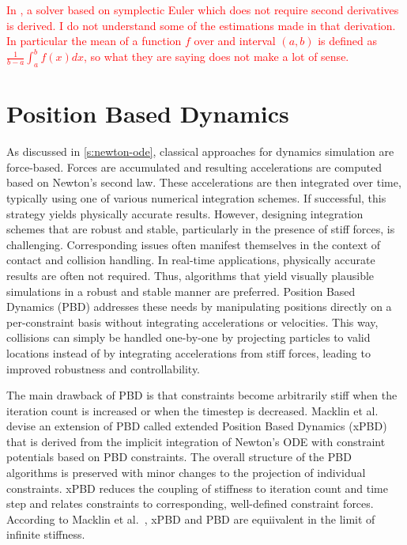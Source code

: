 \textcolor{red}{
    In \cite{servin2006}, a solver based on symplectic Euler which does not require second derivatives is derived. I do not understand some of the
    estimations made in that derivation. In particular the mean of a function $f$ over and interval $(a, b)$ is defined as $\frac{1}{b-a}
    \int_a^b f(x) dx$, so what they are saying does not make a lot of sense.}

\section{Position Based Dynamics}\label{s:pbd}
As discussed in \cref{s:newton-ode}, classical approaches for dynamics simulation are force-based. Forces are accumulated and resulting accelerations
are computed based on Newton's second law. These accelerations are then integrated over time, typically using one of various numerical integration
schemes. If successful, this strategy yields physically accurate results. However, designing integration schemes that are robust and stable,
particularly in the presence of stiff forces, is challenging. Corresponding issues often manifest themselves in the context of contact and collision 
handling. In real-time applications, physically accurate results are often not required. Thus, algorithms that yield visually
plausible simulations in a robust and stable manner are preferred. Position Based Dynamics (PBD) \cite{mueller2006} addresses these needs by 
manipulating positions directly on a per-constraint basis without integrating accelerations or velocities. This way, collisions can simply be handled 
one-by-one by projecting particles to valid locations instead of by integrating accelerations from stiff forces, leading to improved robustness and 
controllability. 

The main drawback of PBD is that constraints become arbitrarily stiff when the iteration count is increased or when the timestep is decreased.
Macklin et al.\ \cite{macklin2016} devise an extension of PBD called extended Position Based Dynamics (xPBD) that is derived from the implicit
integration of Newton's ODE with constraint potentials based on PBD constraints. The overall structure of the PBD algorithms is preserved with 
minor changes to the projection of individual constraints. xPBD reduces the coupling of stiffness to iteration count and time step and relates 
constraints to corresponding, well-defined constraint forces. According to Macklin et al.\ , xPBD and PBD are equiivalent in the limit of infinite
stiffness. 

